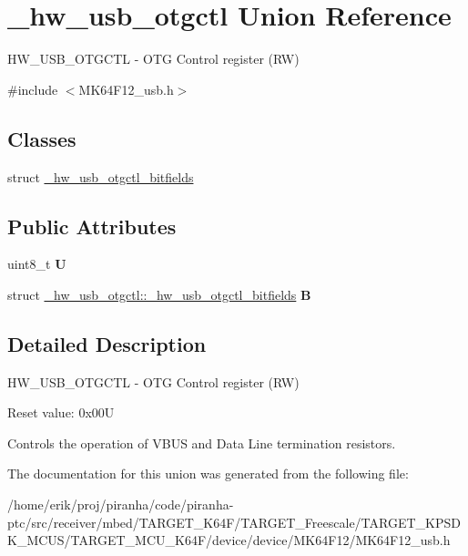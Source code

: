 \hypertarget{union__hw__usb__otgctl}{}\section{\+\_\+hw\+\_\+usb\+\_\+otgctl Union Reference}
\label{union__hw__usb__otgctl}


H\+W\+\_\+\+U\+S\+B\+\_\+\+O\+T\+G\+C\+TL -\/ O\+TG Control register (RW)  




{\ttfamily \#include $<$M\+K64\+F12\+\_\+usb.\+h$>$}

\subsection*{Classes}
\begin{DoxyCompactItemize}
\item 
struct \hyperlink{struct__hw__usb__otgctl_1_1__hw__usb__otgctl__bitfields}{\+\_\+hw\+\_\+usb\+\_\+otgctl\+\_\+bitfields}
\end{DoxyCompactItemize}
\subsection*{Public Attributes}
\begin{DoxyCompactItemize}
\item 
uint8\+\_\+t {\bfseries U}\hypertarget{union__hw__usb__otgctl_a22b0129c61fb5c13df2a6b8efdaea0d4}{}\label{union__hw__usb__otgctl_a22b0129c61fb5c13df2a6b8efdaea0d4}

\item 
struct \hyperlink{struct__hw__usb__otgctl_1_1__hw__usb__otgctl__bitfields}{\+\_\+hw\+\_\+usb\+\_\+otgctl\+::\+\_\+hw\+\_\+usb\+\_\+otgctl\+\_\+bitfields} {\bfseries B}\hypertarget{union__hw__usb__otgctl_a97681f6d65c3fc303f8c82c475c639c9}{}\label{union__hw__usb__otgctl_a97681f6d65c3fc303f8c82c475c639c9}

\end{DoxyCompactItemize}


\subsection{Detailed Description}
H\+W\+\_\+\+U\+S\+B\+\_\+\+O\+T\+G\+C\+TL -\/ O\+TG Control register (RW) 

Reset value\+: 0x00U

Controls the operation of V\+B\+US and Data Line termination resistors. 

The documentation for this union was generated from the following file\+:\begin{DoxyCompactItemize}
\item 
/home/erik/proj/piranha/code/piranha-\/ptc/src/receiver/mbed/\+T\+A\+R\+G\+E\+T\+\_\+\+K64\+F/\+T\+A\+R\+G\+E\+T\+\_\+\+Freescale/\+T\+A\+R\+G\+E\+T\+\_\+\+K\+P\+S\+D\+K\+\_\+\+M\+C\+U\+S/\+T\+A\+R\+G\+E\+T\+\_\+\+M\+C\+U\+\_\+\+K64\+F/device/device/\+M\+K64\+F12/M\+K64\+F12\+\_\+usb.\+h\end{DoxyCompactItemize}
